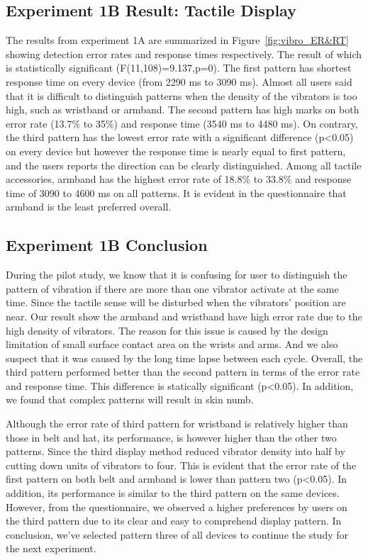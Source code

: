 \documentclass{sigchi}
\begin{document}
\subsection{Experiment 1B Result: Tactile Display}
The results from experiment 1A are summarized in Figure~\ref{fig:vibro_ER&RT} showing detection error rates and response times respectively. The result of which is statistically significant (F(11,108)=9.137,p=0). The first pattern has shortest response time on every device (from 2290 ms to 3090 ms). Almost all users said that it is difficult to distinguish patterns when the density of the vibrators is too high, such as wristband or armband. The second pattern has high marks on both error rate (13.7\% to 35\%) and response time (3540 ms to 4480 ms). On contrary, the third pattern has the lowest error rate with a significant difference (p\textless0.05) on every device but however the response time is nearly equal to first pattern, and the users reports the direction can be clearly distinguished. Among all tactile accessories, armband has the highest error rate of 18.8\% to 33.8\% and response time of 3090 to 4600 ms on all patterns. It is evident in the questionnaire that armband is the least preferred overall.

\subsection{Experiment 1B Conclusion}
During the pilot study, we know that it is confusing for user to distinguish the pattern of vibration if there are more than one vibrator activate at the same time. Since the tactile sense will be disturbed when the vibrators' position are near. Our result show the armband and wristband have high error rate due to the high density of vibrators. The reason for this issue is caused by the design limitation of small surface contact area on the wrists and arms. And we also suspect that it was caused by the long time lapse between each cycle. Overall, the third pattern performed better than the second pattern in terms of the error rate and response time. This difference is statically significant (p\textless0.05). In addition, we found that complex patterns will result in skin numb.

Although the error rate of third pattern for wristband is relatively higher than those in belt and hat, its performance, is however higher than the other two patterns. Since the third display method reduced vibrator density into half by cutting down units of vibrators to four. This is evident that the error rate of the first pattern on both belt and armband is lower than pattern two (p\textless0.05). In addition, its performance is similar to the third pattern on the same devices. However, from the questionnaire, we observed a higher preferences by users on the third pattern due to its clear and easy to comprehend display pattern. In conclusion, we've selected pattern three of all devices to continue the study for the next experiment.
\end{document}
